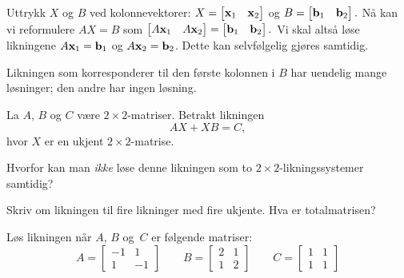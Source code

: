 \begin{losning}
\begin{punkt}
Uttrykk $X$ og $B$ ved kolonnevektorer: $X=\begin{bmatrix}
\mathbf{x}_1 & \mathbf{x}_2
\end{bmatrix}$ og $B=\begin{bmatrix}
\mathbf{b}_1 & \mathbf{b}_2
\end{bmatrix}.$ Nå kan vi reformulere $AX=B$ som $\begin{bmatrix}
A\mathbf{x}_1 & A\mathbf{x}_2
\end{bmatrix}=\begin{bmatrix}
\mathbf{b}_1 & \mathbf{b}_2
\end{bmatrix}.$ Vi skal altså løse likningene $A\mathbf{x}_1=\mathbf{b}_1$ og $A\mathbf{x}_2=\mathbf{b}_2$. Dette kan selvfølgelig gjøres samtidig. 
\end{punkt}

\begin{punkt}
Likningen som korresponderer til den første kolonnen i $B$ har uendelig mange løsninger; den andre har ingen løsning.
\end{punkt}

\end{losning}

\begin{oppgave}
La $A$, $B$ og $C$ være  $2\times 2$-matriser. Betrakt likningen $$AX+XB=C,$$ hvor $X$ er en ukjent $2\times 2$-matrise.

\begin{punkt}
Hvorfor kan man \emph{ikke} løse denne likningen som to $2\times 2$-likningssystemer samtidig?
\end{punkt}

\begin{punkt}
Skriv om likningen til fire likninger med fire ukjente. Hva er totalmatrisen? 
\end{punkt}


\begin{punkt}
Løs likningen når $A$, $B$ og~$C$ er følgende matriser:
\[
A=\begin{bmatrix}
-1 & 1\\
1 & -1
\end{bmatrix}
\qquad
B=\begin{bmatrix}
2 & 1\\
1 & 2
\end{bmatrix}
\qquad
C=\begin{bmatrix}
1 & 1\\
1 & 1
\end{bmatrix}
\]
\end{punkt}

\end{oppgave}


